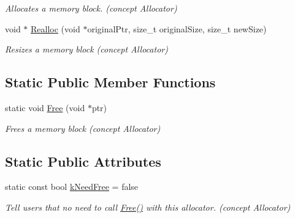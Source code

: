 \begin{DoxyCompactItemize}
\begin{DoxyCompactList}\small\item\em Allocates a memory block. (concept Allocator) \end{DoxyCompactList}\item 
void $\ast$ \hyperlink{class_memory_pool_allocator_aba75280d42184b0ad414243f7f5ac6c7}{Realloc} (void $\ast$original\+Ptr, size\+\_\+t original\+Size, size\+\_\+t new\+Size)\hypertarget{class_memory_pool_allocator_aba75280d42184b0ad414243f7f5ac6c7}{}\label{class_memory_pool_allocator_aba75280d42184b0ad414243f7f5ac6c7}

\begin{DoxyCompactList}\small\item\em Resizes a memory block (concept Allocator) \end{DoxyCompactList}\end{DoxyCompactItemize}
\subsection*{Static Public Member Functions}
\begin{DoxyCompactItemize}
\item 
static void \hyperlink{class_memory_pool_allocator_a6b180eb150451b4df8b70d827cd1191c}{Free} (void $\ast$ptr)\hypertarget{class_memory_pool_allocator_a6b180eb150451b4df8b70d827cd1191c}{}\label{class_memory_pool_allocator_a6b180eb150451b4df8b70d827cd1191c}

\begin{DoxyCompactList}\small\item\em Frees a memory block (concept Allocator) \end{DoxyCompactList}\end{DoxyCompactItemize}
\subsection*{Static Public Attributes}
\begin{DoxyCompactItemize}
\item 
static const bool \hyperlink{class_memory_pool_allocator_ab4c7c5c631e451689bc9da392a65194f}{k\+Need\+Free} = false\hypertarget{class_memory_pool_allocator_ab4c7c5c631e451689bc9da392a65194f}{}\label{class_memory_pool_allocator_ab4c7c5c631e451689bc9da392a65194f}

\begin{DoxyCompactList}\small\item\em Tell users that no need to call \hyperlink{class_memory_pool_allocator_a6b180eb150451b4df8b70d827cd1191c}{Free()} with this allocator. (concept Allocator) \end{DoxyCompactList}\end{DoxyCompactItemize}


